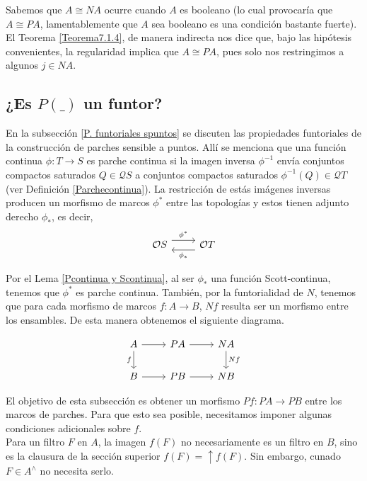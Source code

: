 Sabemos que $A\cong NA$ ocurre cuando $A$ es booleano (lo cual provocaría que $A\cong PA$, lamentablemente que $A$ sea booleano es una condición bastante fuerte). El Teorema \ref{Teorema7.1.4}, de manera indirecta nos dice que, bajo las hipótesis convenientes, la regularidad implica que $A\cong PA$, pues solo nos restringimos a algunos $j\in NA$.

\subsection{¿Es $P( \_ )$ un funtor?}

En la subsección \ref{P. funtoriales spuntos} se discuten las propiedades funtoriales de la construcción de parches sensible a puntos. Allí se menciona que una función continua $\phi\colon T\to S$ es parche continua si la imagen inversa $\phi^{-1}$ envía conjuntos compactos saturados $Q\in \mathcal{Q}S$ a conjuntos compactos saturados $\phi^{-1}(Q)\in \mathcal{Q}T$ (ver Definición \ref{Parchecontinua}). La restricción de estás imágenes inversas producen un morfismo de marcos $\phi^*$ entre las topologías y estos tienen adjunto derecho $\phi_*$, es decir,
\[\begin{tikzcd}
	{\mathcal{O}S} & {\mathcal{O}T}
	\arrow["{\phi^*}", shift left=2, from=1-1, to=1-2]
	\arrow["{\phi_*}", shift left=2, from=1-2, to=1-1]
\end{tikzcd}\]

Por el Lema \ref{Pcontinua y Scontinua}, al ser $\phi_*$ una función Scott-continua, tenemos que $\phi^*$ es parche continua. También, por la funtorialidad de $N$, tenemos que para cada morfismo de marcos $f\colon A\to B$, $Nf$ resulta ser un morfismo entre los ensambles. De esta manera obtenemos el siguiente diagrama.

\[\begin{tikzcd}
	A & PA & NA \\
	B & PB & NB
	\arrow[from=1-1, to=1-2]
	\arrow["f"', from=1-1, to=2-1]
	\arrow[from=1-2, to=1-3]
	\arrow["Nf", from=1-3, to=2-3]
	\arrow[from=2-1, to=2-2]
	\arrow[from=2-2, to=2-3]
\end{tikzcd}\]

El objetivo de esta subsección es obtener un morfismo $Pf\colon PA\to PB$ entre los marcos de parches. Para que esto sea posible, necesitamos imponer algunas condiciones adicionales sobre $f$.\\

Para un filtro $F$ en $A$, la imagen $f(F)$ no necesariamente es un filtro en $B$, sino es la clausura de la sección superior $f(F)=\uparrow f(F)$. Sin embargo, cunado $F\in A^\wedge$ no necesita serlo.

